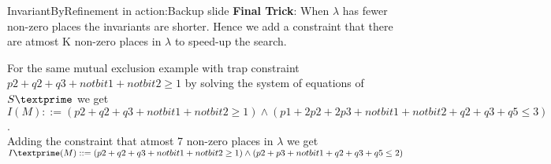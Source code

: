 \documentclass{beamer}
\begin{document}
\begin{frame}{InvariantByRefinement in action:Backup slide}
  \textbf{Final Trick}:
  When $\lambda$ has fewer non-zero places the invariants are shorter. Hence we add a constraint that there are atmost K non-zero places in $\lambda$ to speed-up the search.
\begin{example}
For the same mutual exclusion example with trap constraint  $p2+q2+q3+notbit1+notbit2 \geq 1$  by solving the system of equations of $S\textprime$
we get \\
$I(M)::=(p2+q2+q3+notbit1+notbit2\geq1) \land (p1+2p2+2p3+notbit1+notbit2+q2+q3+q5\leq3)$.\\
Adding the constraint that atmost 7 non-zero places in $\lambda $ we get \\
$I\textprime(M)::=(p2+q2+q3+notbit1+notbit2\geq1) \land (p2+p3+notbit1+q2+q3+q5 \leq 2)$

\end{example}
\end{frame}




  
\end{document}
